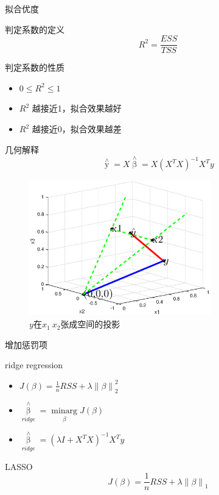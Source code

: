 \documentclass[xetex,mathserif,serif]{beamer}
\begin{document}
\begin{frame}{拟合优度}
\begin{block}{判定系数的定义}
\[{R^2} = \frac{{ESS}}{{TSS}}\]
\end{block}

\begin{block}{判定系数的性质}
\begin{itemize}
  \item $0 \leq R^2 \leq 1$
  \item $R^2$ 越接近1，拟合效果越好
  \item $R^2$ 越接近0，拟合效果越差
\end{itemize}
\end{block}
\end{frame}

\begin{frame}{几何解释}
\[\mathop y\limits^ \wedge   = X\mathop \beta \limits^ \wedge   = X{\left( {{X^T}X} \right)^{ - 1}}{X^T}y\]

\begin{figure}
  \centering
  \includegraphics[width=0.7\textwidth]{projection.eps}
  \caption{$y$在$x_1 \ x_2$张成空间的投影}\label{1}
\end{figure}

\end{frame}

\begin{frame}{增加惩罚项}
\begin{block}{ridge regression}
\begin{itemize}
  \item $J\left( \beta  \right) = \frac{1}{n}RSS + \lambda \left\| \beta  \right\|_2^2$
  \item ${\mathop \beta \limits^ \wedge  _{ridge}} = \mathop {\min \arg }\limits_\beta  J\left( \beta  \right)$
  \item ${\mathop \beta \limits^ \wedge  _{ridge}} = {\left( {\lambda I + {X^T}X} \right)^{ - 1}}{X^T}y$
\end{itemize}
\end{block}

\begin{block}{LASSO}
  \[J\left( \beta  \right) = \frac{1}{n}RSS + \lambda \left\| \beta  \right\|_1\]
\end{block}
\end{frame}
\end{document}
